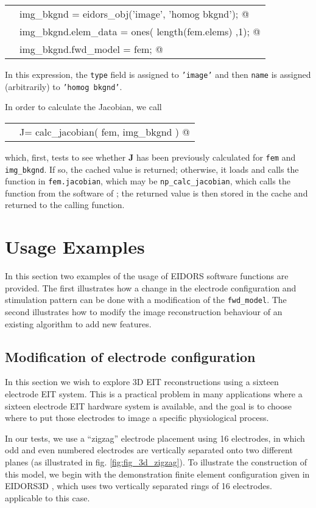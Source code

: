 \documentclass[12pt]{iopart}
\makeatletter
\newcommand{\CODEstart}{\medskip\begin{tabular}{ll}}
\newcommand{\CN}{\tt\scriptsize} %
\newcommand{\CC}{&\small\verb@}   % start code
\newcommand{\CODEend}{\end{tabular}\medskip}
\makeatother
\begin{document}
\CODEstart
\CN    \CC img_bkgnd           = eidors_obj('image', 'homog bkgnd'); @\\[-3pt]
\CN    \CC img_bkgnd.elem_data = ones( length(fem.elems) ,1); @\\[-3pt]
\CN    \CC img_bkgnd.fwd_model = fem; @\\[-3pt]
\CODEend

In this expression, the {\tt type} field is assigned
to {\tt 'image'} and then {\tt name} is assigned
(arbitrarily) to {\tt 'homog bkgnd'}.

In order to calculate the Jacobian, we call

\CODEstart
\CN    \CC J= calc_jacobian( fem, img_bkgnd ) @\\[-3pt]
\CODEend

which, first, tests to see whether {\bf J} has been previously
calculated for {\tt fem} and {\tt img\_bkgnd}. If
so, the cached value is returned; otherwise,
it loads and calls the function in {\tt fem.jacobian},
which may be {\tt np\_calc\_jacobian}, which 
calls the function from the software of
\cite{Polydorides_and_Lionheart_2002}; the returned
value is then stored in the cache and returned to the
calling function.

\section{ Usage Examples}

In this section two examples of the usage of EIDORS
software functions are provided. The first illustrates
how a change in the electrode configuration and stimulation 
pattern can be done
with a modification of the {\tt fwd\_model}.
The second illustrates how to modify the image reconstruction
behaviour of an existing algorithm to
add new features.

\subsection{Modification of electrode configuration}

In this section we wish to explore 3D EIT reconstructions
using a sixteen electrode EIT system. This is a practical
problem in many applications where a sixteen electrode
EIT hardware system is available, and the goal is to 
choose where to put those electrodes to image a specific
physiological process.

In our tests, we use a ``zigzag'' electrode placement 
using 16 electrodes, in which odd and even numbered
electrodes are vertically separated onto two different
planes (as illustrated in fig. \ref{fig:fig_3d_zigzag}).
To illustrate the construction of this model, we begin
with the demonstration finite element configuration
given in EIDORS3D \cite{Polydorides_and_Lionheart_2002},
which uses two vertically separated rings of 16 electrodes.
applicable to this case.
\end{document}
